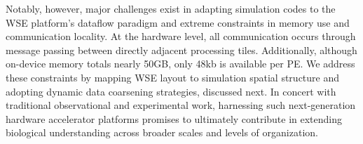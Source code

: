 Notably, however, major challenges exist in adapting simulation codes to the WSE platform's dataflow paradigm and extreme constraints in memory use and communication locality.
At the hardware level, all communication occurs through message passing between directly adjacent processing tiles.
Additionally, although on-device memory totals nearly 50GB, only 48kb is available per PE.
We address these constraints by mapping WSE layout to simulation spatial structure and adopting dynamic data coarsening strategies, discussed next.
In concert with traditional observational and experimental work, harnessing such next-generation hardware accelerator platforms promises to ultimately contribute in extending biological understanding across broader scales and levels of organization.







